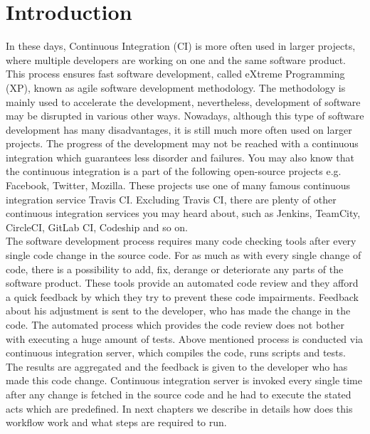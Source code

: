 
\newtheorem{DEF}{Definition}

\chapter{Introduction}

In these days, Continuous Integration (CI) is more often used in larger projects, where multiple developers are working on one and the same software product. This process ensures fast software development, called eXtreme Programming (XP), known as agile software development methodology. The methodology is mainly used to accelerate the development, nevertheless, development of software may be disrupted in various other ways. Nowadays, although this type of software development has many disadvantages, it is still much more often used on larger projects. The progress of the development may not be reached with a continuous integration which guarantees less disorder and failures. You may also know that the continuous integration is a part of the following open-source projects e.g. Facebook, Twitter, Mozilla. These projects use one of many famous continuous integration service Travis CI. Excluding Travis CI, there are plenty of other continuous integration services you may heard about, such as Jenkins, TeamCity, CircleCI, GitLab CI, Codeship and so on.\\

The software development process requires many code checking tools after every single code change in the source code. For as much as with every single change of code, there is a possibility to add, fix, derange or deteriorate any parts of the software product. These tools provide an automated code review and they afford a quick feedback by which they try to prevent these code impairments. Feedback about his adjustment is sent to the developer, who has made the change in the code. The automated process which provides the code review does not bother with executing a huge amount of tests. Above mentioned process is conducted via continuous integration server, which compiles the code, runs scripts and tests. The results are aggregated and the feedback is given to the developer who has made this code change. Continuous integration server is invoked every single time after any change is fetched in the source code and he had to execute the stated acts which are predefined. In next chapters we describe in details how does this workflow work and what steps are required to run.\\

